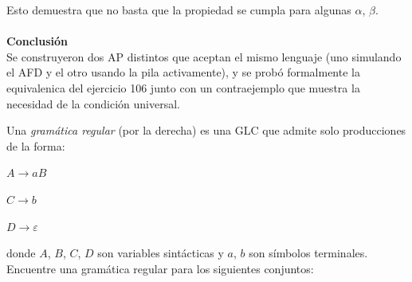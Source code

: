 \documentclass[12pt]{article}
\begin{document}
{        Esto demuestra que no basta que la propiedad se cumpla para algunas $\alpha$, $\beta$. \\ \\

        \textbf{Conclusión} \\
        Se construyeron dos AP distintos que aceptan el mismo lenguaje (uno simulando el AFD y el otro usando la pila activamente),
        y se probó formalmente la equivalenica del ejercicio 106 junto con un contraejemplo que muestra la necesidad de la condición universal.
    }







 Una \textit{gramática regular} (por la derecha) es una GLC que admite solo producciones de la forma: \par
$A \rightarrow aB$ \par
$C \rightarrow b$ \par
$D \rightarrow \varepsilon$ \par
donde $A$, $B$, $C$, $D$ son variables sintácticas y $a$, $b$ son símbolos terminales.
Encuentre una gramática regular para los siguientes conjuntos:
\end{document}

